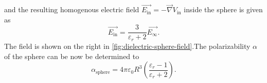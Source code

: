 and the resulting  homogenous electric field $\vec{E_\mathrm{in}} = -\vec{\nabla} V_\mathrm{in}$ inside the sphere is given as
\begin{equation}
  \vec{E_\mathrm{in}} = \frac{3}{\varepsilon_r + 2} \vec{E_\infty} .
\end{equation}
The field is shown on the right in \cref{fig:dielectric-sphere-field}.The polarizability $\alpha$ of the sphere can be now be determined to
\begin{equation}
  \alpha_\mathrm{sphere} = 4\pi \varepsilon_0 R^3 \left(\frac{\varepsilon_r - 1}{\varepsilon_r + 2}\right).
\end{equation}


